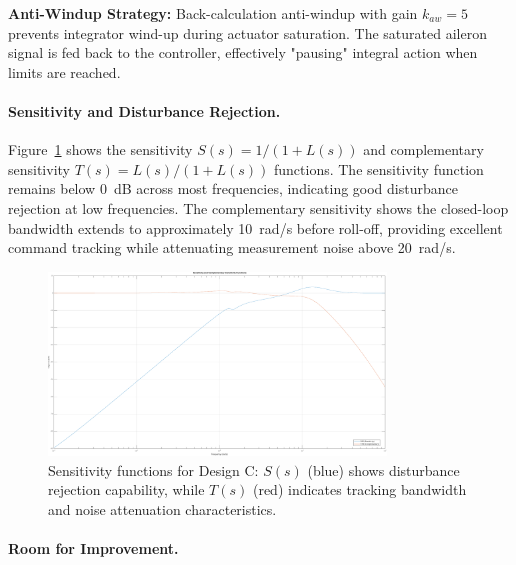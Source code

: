\textbf{Anti-Windup Strategy:}
Back-calculation anti-windup with gain $k_{aw}=5$ prevents integrator wind-up during actuator saturation. The saturated aileron signal is fed back to the controller, effectively "pausing" integral action when limits are reached.

\paragraph{Sensitivity and Disturbance Rejection.}
Figure~\ref{fig:sensitivity_functions} shows the sensitivity $S(s) = 1/(1+L(s))$ and complementary sensitivity $T(s) = L(s)/(1+L(s))$ functions. The sensitivity function remains below 0~dB across most frequencies, indicating good disturbance rejection at low frequencies. The complementary sensitivity shows the closed-loop bandwidth extends to approximately 10~rad/s before roll-off, providing excellent command tracking while attenuating measurement noise above 20~rad/s.

\begin{figure}[h!]
\centering
\includegraphics[width=0.8\textwidth]{../MATLAB/LaTeX_Exports/sensitivity_functions.pdf}
\caption{Sensitivity functions for Design C: $S(s)$ (blue) shows disturbance rejection capability, while $T(s)$ (red) indicates tracking bandwidth and noise attenuation characteristics.}
\label{fig:sensitivity_functions}
\end{figure}

\paragraph{Room for Improvement.}

